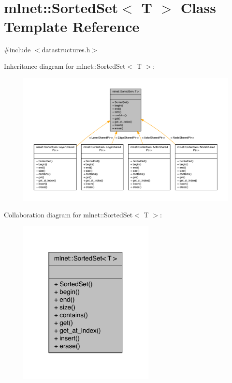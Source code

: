 \hypertarget{classmlnet_1_1_sorted_set}{\section{mlnet\+:\+:Sorted\+Set$<$ T $>$ Class Template Reference}
\label{classmlnet_1_1_sorted_set}
}


{\ttfamily \#include $<$datastructures.\+h$>$}



Inheritance diagram for mlnet\+:\+:Sorted\+Set$<$ T $>$\+:\nopagebreak
\begin{figure}[H]
\begin{center}
\leavevmode
\includegraphics[width=350pt]{classmlnet_1_1_sorted_set__inherit__graph}
\end{center}
\end{figure}


Collaboration diagram for mlnet\+:\+:Sorted\+Set$<$ T $>$\+:\nopagebreak
\begin{figure}[H]
\begin{center}
\leavevmode
\includegraphics[width=194pt]{classmlnet_1_1_sorted_set__coll__graph}
\end{center}
\end{figure}
